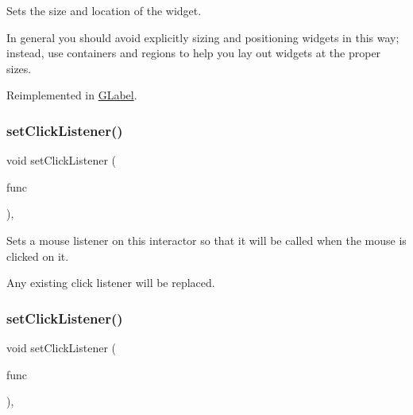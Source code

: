 Sets the size and location of the widget. 

In general you should avoid explicitly sizing and positioning widgets in this way; instead, use containers and regions to help you lay out widgets at the proper sizes. 

Reimplemented in \mbox{\hyperlink{classsgl_1_1GLabel_adb836652705fdc4b7e90b7a3afc56a37}{G\+Label}}.

\mbox{\label{classsgl_1_1GInteractor_abd40af6921242584d0954f173911b190}} 
\subsubsection{\texorpdfstring{set\+Click\+Listener()}{setClickListener()}\hspace{0.1cm}{\footnotesize\ttfamily [1/2]}}
{\footnotesize\ttfamily void set\+Click\+Listener (\begin{DoxyParamCaption}\item[{\mbox{\hyperlink{namespacesgl_ae9f3e9eab70035da1a2b114e21357b25}{G\+Event\+Listener}}}]{func }\end{DoxyParamCaption})\hspace{0.3cm}{\ttfamily [virtual]}, {\ttfamily [inherited]}}



Sets a mouse listener on this interactor so that it will be called when the mouse is clicked on it. 

Any existing click listener will be replaced. \mbox{\label{classsgl_1_1GInteractor_a856414c92df90f56f3877475eb3f8fc4}} 
\subsubsection{\texorpdfstring{set\+Click\+Listener()}{setClickListener()}\hspace{0.1cm}{\footnotesize\ttfamily [2/2]}}
{\footnotesize\ttfamily void set\+Click\+Listener (\begin{DoxyParamCaption}\item[{\mbox{\hyperlink{namespacesgl_a54427ce97bb1c2804e4fe2b0a62e8b17}{G\+Event\+Listener\+Void}}}]{func }\end{DoxyParamCaption})\hspace{0.3cm}{\ttfamily [virtual]}, {\ttfamily [inherited]}}



